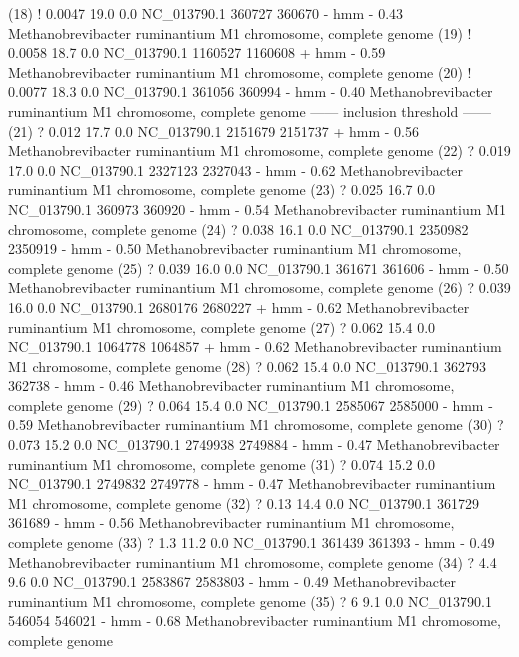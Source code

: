 \begin{sreoutput}
 (18) !    0.0047   19.0   0.0  NC_013790.1  360727  360670 - hmm     - 0.43  Methanobrevibacter ruminantium M1 chromosome, complete genome
 (19) !    0.0058   18.7   0.0  NC_013790.1 1160527 1160608 + hmm     - 0.59  Methanobrevibacter ruminantium M1 chromosome, complete genome
 (20) !    0.0077   18.3   0.0  NC_013790.1  361056  360994 - hmm     - 0.40  Methanobrevibacter ruminantium M1 chromosome, complete genome
 ------ inclusion threshold ------
 (21) ?     0.012   17.7   0.0  NC_013790.1 2151679 2151737 + hmm     - 0.56  Methanobrevibacter ruminantium M1 chromosome, complete genome
 (22) ?     0.019   17.0   0.0  NC_013790.1 2327123 2327043 - hmm     - 0.62  Methanobrevibacter ruminantium M1 chromosome, complete genome
 (23) ?     0.025   16.7   0.0  NC_013790.1  360973  360920 - hmm     - 0.54  Methanobrevibacter ruminantium M1 chromosome, complete genome
 (24) ?     0.038   16.1   0.0  NC_013790.1 2350982 2350919 - hmm     - 0.50  Methanobrevibacter ruminantium M1 chromosome, complete genome
 (25) ?     0.039   16.0   0.0  NC_013790.1  361671  361606 - hmm     - 0.50  Methanobrevibacter ruminantium M1 chromosome, complete genome
 (26) ?     0.039   16.0   0.0  NC_013790.1 2680176 2680227 + hmm     - 0.62  Methanobrevibacter ruminantium M1 chromosome, complete genome
 (27) ?     0.062   15.4   0.0  NC_013790.1 1064778 1064857 + hmm     - 0.62  Methanobrevibacter ruminantium M1 chromosome, complete genome
 (28) ?     0.062   15.4   0.0  NC_013790.1  362793  362738 - hmm     - 0.46  Methanobrevibacter ruminantium M1 chromosome, complete genome
 (29) ?     0.064   15.4   0.0  NC_013790.1 2585067 2585000 - hmm     - 0.59  Methanobrevibacter ruminantium M1 chromosome, complete genome
 (30) ?     0.073   15.2   0.0  NC_013790.1 2749938 2749884 - hmm     - 0.47  Methanobrevibacter ruminantium M1 chromosome, complete genome
 (31) ?     0.074   15.2   0.0  NC_013790.1 2749832 2749778 - hmm     - 0.47  Methanobrevibacter ruminantium M1 chromosome, complete genome
 (32) ?      0.13   14.4   0.0  NC_013790.1  361729  361689 - hmm     - 0.56  Methanobrevibacter ruminantium M1 chromosome, complete genome
 (33) ?       1.3   11.2   0.0  NC_013790.1  361439  361393 - hmm     - 0.49  Methanobrevibacter ruminantium M1 chromosome, complete genome
 (34) ?       4.4    9.6   0.0  NC_013790.1 2583867 2583803 - hmm     - 0.49  Methanobrevibacter ruminantium M1 chromosome, complete genome
 (35) ?         6    9.1   0.0  NC_013790.1  546054  546021 - hmm     - 0.68  Methanobrevibacter ruminantium M1 chromosome, complete genome
\end{sreoutput}

